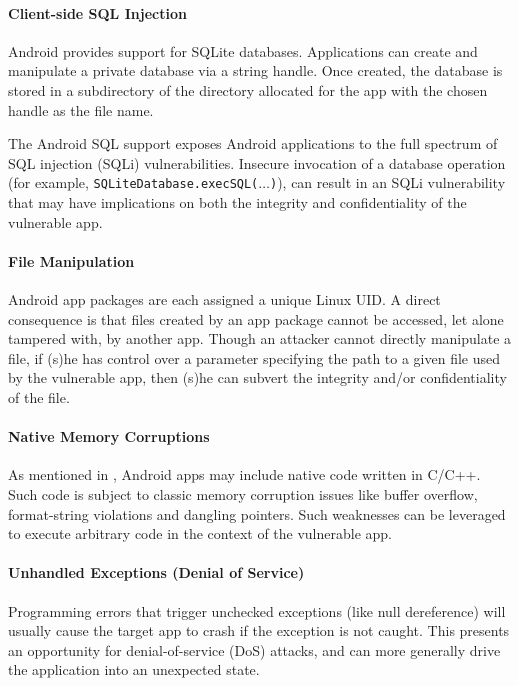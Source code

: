 
\paragraph{Client-side SQL Injection} Android provides support for SQLite databases. Applications can create
and manipulate a private database via a string handle. Once created, the database
is stored in a subdirectory of the directory allocated for the app
with the chosen handle as the file name. 

The Android SQL
support exposes Android applications to the full spectrum of SQL injection (SQLi) vulnerabilities.
Insecure invocation of a database operation (for example, \texttt{SQLiteDatabase.execSQL($\ldots$)}), can result in an SQLi vulnerability that may have
implications on both the integrity and confidentiality of the vulnerable
app.

\paragraph{File Manipulation} Android
app packages are each assigned a unique Linux UID. A direct consequence
is that files created by an app package cannot be accessed,
let alone tampered with, by another app. Though an attacker cannot directly manipulate a file, if (s)he has control over a parameter specifying the path to a given
 file used by the vulnerable app, then (s)he can subvert
the integrity and/or confidentiality of the file.

\paragraph{Native Memory Corruptions} As mentioned in , Android apps may include
native code written in C/C++. Such code is subject
to classic memory corruption issues like buffer overflow, 
format-string violations and dangling pointers. Such weaknesses can be leveraged to execute arbitrary
code in the context of the vulnerable app.


\paragraph{Unhandled Exceptions (Denial of Service)} Programming errors that trigger unchecked exceptions (like null dereference)
will usually cause the target app to crash if the exception
is not caught. This presents an opportunity for denial-of-service (DoS) attacks, and can more generally drive the application into an unexpected state.